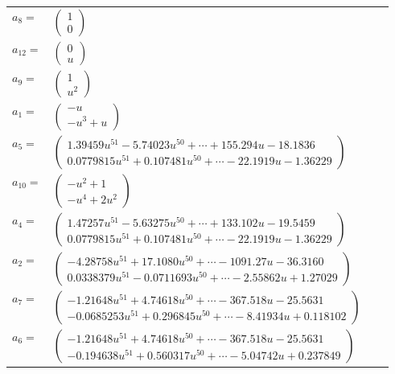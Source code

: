 \documentclass[1p]{elsarticle_modified}
\theoremstyle{definition}
\begin{document}
\begin{tabular}{m{7pt} m{180pt} m{7pt} m{180pt} }
\flushright $a_{8}=$&$\begin{pmatrix}1\\0\end{pmatrix}$ \\
\flushright $a_{12}=$&$\begin{pmatrix}0\\u\end{pmatrix}$ \\
\flushright $a_{9}=$&$\begin{pmatrix}1\\u^2\end{pmatrix}$ \\
\flushright $a_{1}=$&$\begin{pmatrix}- u\\- u^3+u\end{pmatrix}$ \\
\flushright $a_{5}=$&$\begin{pmatrix}1.39459 u^{51}-5.74023 u^{50}+\cdots+155.294 u-18.1836\\0.0779815 u^{51}+0.107481 u^{50}+\cdots-22.1919 u-1.36229\end{pmatrix}$ \\
\flushright $a_{10}=$&$\begin{pmatrix}- u^2+1\\- u^4+2 u^2\end{pmatrix}$ \\
\flushright $a_{4}=$&$\begin{pmatrix}1.47257 u^{51}-5.63275 u^{50}+\cdots+133.102 u-19.5459\\0.0779815 u^{51}+0.107481 u^{50}+\cdots-22.1919 u-1.36229\end{pmatrix}$ \\
\flushright $a_{2}=$&$\begin{pmatrix}-4.28758 u^{51}+17.1080 u^{50}+\cdots-1091.27 u-36.3160\\0.0338379 u^{51}-0.0711693 u^{50}+\cdots-2.55862 u+1.27029\end{pmatrix}$ \\
\flushright $a_{7}=$&$\begin{pmatrix}-1.21648 u^{51}+4.74618 u^{50}+\cdots-367.518 u-25.5631\\-0.0685253 u^{51}+0.296845 u^{50}+\cdots-8.41934 u+0.118102\end{pmatrix}$ \\
\flushright $a_{6}=$&$\begin{pmatrix}-1.21648 u^{51}+4.74618 u^{50}+\cdots-367.518 u-25.5631\\-0.194638 u^{51}+0.560317 u^{50}+\cdots-5.04742 u+0.237849\end{pmatrix}$ \\

\end{tabular}
\end{document}
